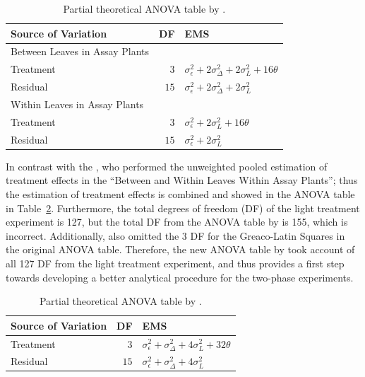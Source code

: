 \documentclass[11pt,a4paper]{article}
\begin{document}
\begin{table}[ht]
\centering
\caption{Partial theoretical ANOVA table by \cite{Curnow1959}.}
\begin{tabular}{lrl} 
\toprule 
\multicolumn{1}{l}{\textbf{Source of Variation}} & \multicolumn{1}{l}{\textbf{DF}} & \multicolumn{1}{l}{\textbf{EMS}}\\ 
\midrule 
Between Leaves in Assay Plants & & \\ 
\quad Treatment & $3$ & $\sigma_{\epsilon}^2 + 2\sigma_{\Delta}^2 + 2\sigma_{L}^2 + 16\theta$ \\ 
\quad Residual & $15$ & $\sigma_{\epsilon}^2 + 2\sigma_{\Delta}^2 + 2\sigma_{L}^2$ \\  \hline
Within Leaves in Assay Plants & & \\
\quad Treatment & $3$ & $\sigma_{\epsilon}^2 +  2\sigma_{L}^2 + 16\theta$ \\ 
\quad Residual & $15$ & $\sigma_{\epsilon}^2 +  2\sigma_{L}^2 $ \\  
\bottomrule 
\end{tabular}
\label{tab:Curnow1959} 
\end{table} 
 
In contrast with the \cite{McIntyre1955}, who performed the unweighted pooled estimation of treatment effects in the ``Between and Within Leaves Within Assay Plants''; thus the estimation of treatment effects is combined and showed in the ANOVA table in Table~\ref{tab:McIntyre1955}. Furthermore, the total degrees of freedom (DF) of the light treatment experiment is 127, but the total DF from the ANOVA table by \cite{McIntyre1955} is 155, which is incorrect. Additionally, \cite{McIntyre1955} also omitted the 3 DF for the Greaco-Latin Squares in the original ANOVA table. Therefore, the new ANOVA table by \cite{Curnow1959} took account of all 127 DF from the light treatment experiment, and thus provides a first step towards developing a better analytical procedure for the two-phase experiments. 
 
\begin{table}[ht]
\centering
\caption{Partial theoretical ANOVA table by \cite{McIntyre1955}.}
\begin{tabular}{lrl} 
\toprule 
\multicolumn{1}{l}{\textbf{Source of Variation}} & \multicolumn{1}{l}{\textbf{DF}} & \multicolumn{1}{l}{\textbf{EMS}}\\ 
\midrule 
Treatment & $3$ & $\sigma_{\epsilon}^2 + \sigma_{\Delta}^2 + 4\sigma_{L}^2 + 32\theta$ \\ 
Residual & $15$ & $\sigma_{\epsilon}^2 + \sigma_{\Delta}^2 + 4\sigma_{L}^2$ \\  
\bottomrule 
\end{tabular}
\label{tab:McIntyre1955} 
\end{table} 
\end{document}
